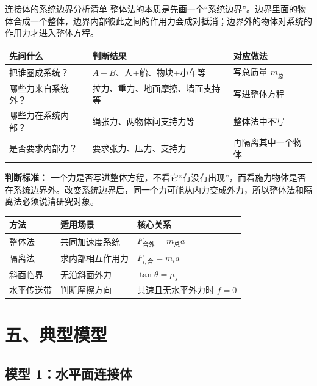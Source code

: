 \begin{learningbox}{连接体的系统边界分析清单}
整体法的本质是先画一个“系统边界”。边界里面的物体合成一个整体，边界内部彼此之间的作用力会成对抵消；边界外的物体对系统的作用力才进入整体方程。

\begin{center}
\begin{tabular}{
  >{\raggedright\arraybackslash}p{}
  >{\raggedright\arraybackslash}p{}
  >{\raggedright\arraybackslash}p{}}
\toprule
先问什么 & 判断结果 & 对应做法 \\
\midrule
把谁圈成系统？ & $A+B$、人+船、物块+小车等 & 写总质量 $m_{\text{总}}$ \\
哪些力来自系统外？ & 拉力、重力、地面摩擦、墙面支持等 & 写进整体方程 \\
哪些力在系统内部？ & 绳张力、两物体间支持力等 & 整体法中不写 \\
是否要求内部力？ & 要求张力、压力、支持力 & 再隔离其中一个物体 \\
\bottomrule
\end{tabular}
\end{center}

\textbf{判断标准：} 一个力是否写进整体方程，不看它“有没有出现”，而看施力物体是否在系统边界外。改变系统边界后，同一个力可能从内力变成外力，所以整体法和隔离法必须说清研究对象。
\end{learningbox}

\begin{center}
\begin{tabular}{lll}
\toprule
方法 & 适用场景 & 核心关系 \\
\midrule
整体法 & 共同加速度系统 & $F_{\text{合外}} = m_{\text{总}} a$ \\
隔离法 & 求内部相互作用力 & $F_{i,\text{合}} = m_i a$ \\
斜面临界 & 无沿斜面外力 & $\tan\theta = \mu_s$ \\
水平传送带 & 判断摩擦方向 & 共速且无水平外力时 $f=0$ \\
\bottomrule
\end{tabular}
\end{center}

\section*{五、典型模型}

\subsection*{模型 1：水平面连接体}

